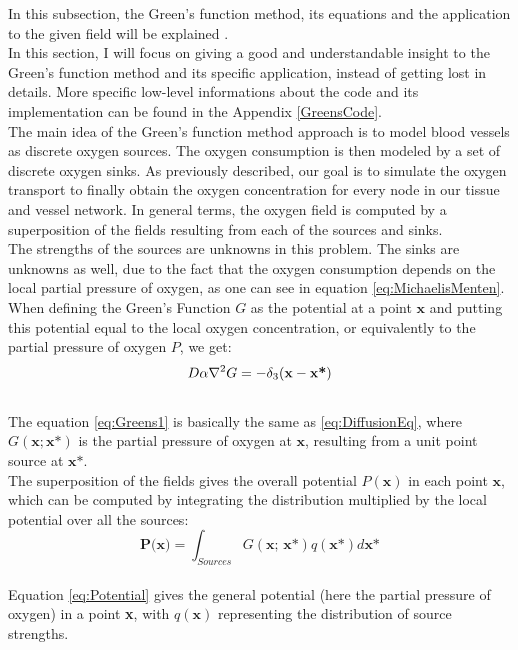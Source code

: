 In this subsection, the Green's function method, its equations and the application to the given field will be explained \cite{secomb1993analysis}.
\\In this section, I will focus on giving a good and understandable insight to the Green's function method and its specific application, instead of getting lost in details. More specific low-level informations about the code and its implementation can be found in the Appendix \ref{GreensCode}.
\\The main idea of the Green's function method approach is to model blood vessels as discrete oxygen sources. The oxygen consumption is then modeled by a set of discrete oxygen sinks. As previously described, our goal is to simulate the oxygen transport to finally obtain the oxygen concentration for every node in our tissue and vessel network. In general terms, the oxygen field is computed by a superposition of the fields resulting from each of the sources and sinks.
\\The strengths of the sources are unknowns in this problem. The sinks are unknowns as well, due to the fact that the oxygen consumption depends on the local partial pressure of oxygen, as one can see in equation \ref{eq:MichaelisMenten}.
%
\\When defining the Green's Function $G$ as the potential at a point $\textbf{x}$ and putting this potential equal to the local oxygen concentration, or equivalently to the partial pressure of oxygen $P$, we get:
\begin{equation}
\\D\alpha\nabla^2G = - \delta_3 
( \textbf{x} - \textbf{x*} )
\label{eq:Greens1}
\end{equation}
\\The equation \ref{eq:Greens1} is basically the same as \ref{eq:DiffusionEq}, where $G(\textbf{x}; \textbf{x*})$ is the partial pressure of oxygen at $\textbf{x}$, resulting from a unit point source at $\textbf{x*}$.
%
\\The superposition of the fields gives the overall potential $P(\textbf{x})$ in each point $\textbf{x}$, which can be computed by integrating the distribution multiplied by the local potential over all the sources:
\begin{equation}
\textbf{P(x)} = \int_{Sources} G(\textbf{x; x*})q(\textbf{x*})d\textbf{x*}
\label{eq:Potential}
\end{equation}
\\ Equation \ref{eq:Potential} gives the general potential (here the partial pressure of oxygen) in a point \textbf{x}, with $q(\textbf{x})$ representing the distribution of source strengths.
